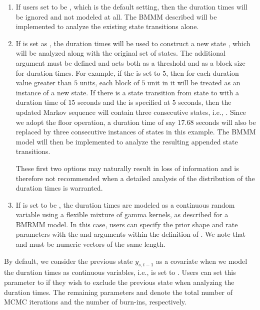 \begin{enumerate}
\item If users set  to be ,  which is the default setting,  then the duration times will be ignored and not modeled at all.  
The BMMM described will be implemented to analyze the existing state transitions alone. 

\item If  is set as ,  the duration times will be used to construct a new state , which will be analyzed along with the original set of states. 
The additional argument  must be defined and acts both as a threshold and as a block size for {duration times}. 
For example, if the  is set to $5$, then for each {duration} value greater than $5$ units, each block of $5$ unit in it will be treated as an instance of a new  state. 
If there is a state transition from state  to  with a duration time of $15$ seconds and the  is specified at $5$ seconds,  then the updated Markov sequence will contain three consecutive  states, i.e.,  .  
{Since we adopt the floor operation,  a {duration time} of say $17.68$ seconds will also be replaced by three consecutive instances of  states in this example.}  
The BMMM model  will then be implemented to analyze the resulting appended state transitions. 


These first two options may naturally result in loss of information and is therefore not recommended when a detailed analysis of the distribution of the {duration times} is warranted. 

\item If  is set to be ,  the duration times are modeled as a continuous random variable using a flexible mixture of gamma kernels, as described for a BMRMM model. 
In this case,  users can specify the prior shape and rate parameters with the  and   arguments within the definition of . 
We note that  and   must be numeric vectors of the same length. 
\end{enumerate}

By default, we consider the previous state $y_{s,t-1}$ as a covariate when we model the {duration times} as continuous variables, i.e.,   is set to . 
Users can set this parameter to  if they wish to exclude the previous state when analyzing the {duration times}.
The remaining parameters  and  denote the total number of MCMC iterations and the number of burn-ins, respectively. 






